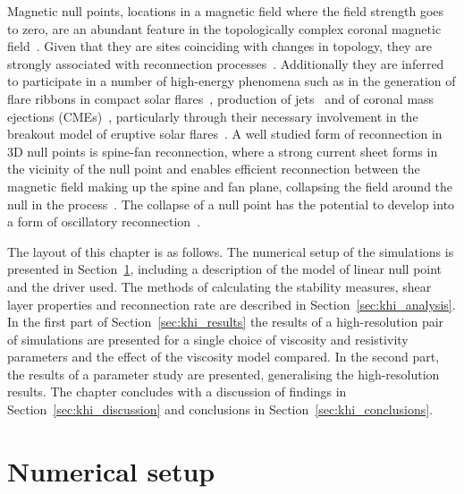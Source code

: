 Magnetic null points, locations in a magnetic field where the field strength goes to zero, are an abundant feature in the topologically complex coronal magnetic field~\cite{edwardsNullPointDistribution2015}. Given that they are sites coinciding with changes in topology, they are strongly associated with reconnection processes~\cite{yangImagingSpectralStudy2020,sunHOTSPINELOOPS2013}. Additionally they are inferred to participate in a number of high-energy phenomena such as in the generation of flare ribbons in compact solar flares~\cite{massonNATUREFLARERIBBONS2009,pontinWhyAreFlare2016a}, production of jets~\cite{moreno-insertisPLASMAJETSERUPTIONS2013} and of coronal mass ejections (CMEs)~\cite{barnesRelationshipCoronalMagnetic2007,zouContinuousNullPointMagnetic2020}, particularly through their necessary involvement in the breakout model of eruptive solar flares~\cite{macleanTopologicalAnalysisMagnetic2005}. A well studied form of reconnection in 3D null points is spine-fan reconnection, where a strong current sheet forms in the vicinity of the null point and enables efficient reconnection between the magnetic field making up the spine and fan plane, collapsing the field around the null in the process~\cite{thurgoodImplosiveCollapseMagnetic2018}. The collapse of a null point has the potential to develop into a form of oscillatory reconnection~\cite{thurgoodThreedimensionalOscillatoryMagnetic2017}.

The layout of this chapter is as follows. The numerical setup of the simulations is presented in Section~\ref{sec:khi_numerical_setup}, including a description of the model of linear null point and the driver used. The methods of calculating the stability measures, shear layer properties and reconnection rate are described in Section~\ref{sec:khi_analysis}. In the first part of Section~\ref{sec:khi_results} the results of a high-resolution pair of simulations are presented for a single choice of viscosity and resistivity parameters and the effect of the viscosity model compared. In the second part, the results of a parameter study are presented, generalising the high-resolution results. The chapter concludes with a discussion of findings in Section~\ref{sec:khi_discussion} and conclusions in Section~\ref{sec:khi_conclusions}.

\section{Numerical setup}

\label{sec:khi_numerical_setup}

